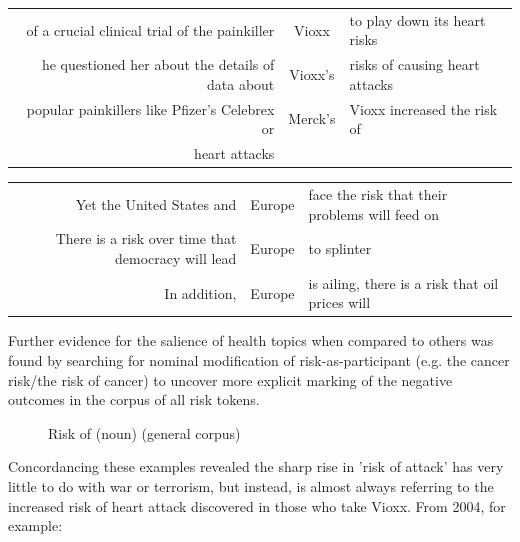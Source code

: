 \begin{table}
\footnotesize
\begin{tabular}{rcl}
of a crucial clinical trial of the painkiller      &     Vioxx    &   to play down its heart risks \\

he questioned her about the details of data about   &  Vioxx's    & risks of causing heart attacks \\

popular painkillers like Pfizer's Celebrex or    &  Merck's     &    Vioxx increased the risk of  \\heart attacks
\end{tabular}
\end{table}
\begin{table}
\footnotesize
\begin{tabular}{rcl}
Yet the United States and           &        Europe    &      face the risk that their problems will feed on \\
There is a risk over time that democracy will lead &   Europe  &    to splinter \\
In addition,  &   Europe  &    is ailing, there is a risk that oil prices will \\
\end{tabular}
\end{table}

Further evidence for the salience of health topics when compared to others was found by searching for nominal modification of risk-as-participant (e.g. the cancer risk\slash the risk of cancer) to uncover more explicit marking of the negative outcomes in the corpus of all risk tokens.

\begin{figure}[htb!]
\centering
{}
\caption{Risk of (noun) (general corpus)}
\end{figure}

Concordancing these examples revealed the sharp rise in 'risk of attack' has very little to do with war or terrorism, but instead, is almost always referring to the increased risk of heart attack discovered in those who take Vioxx. From 2004, for example: 

